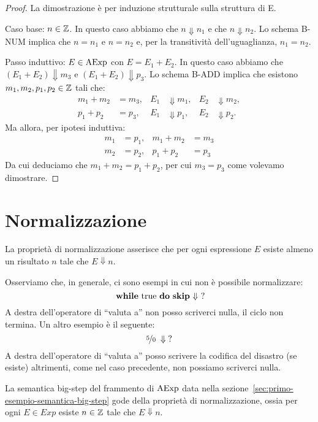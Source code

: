 \begin{proof}
La dimostrazione è per induzione strutturale sulla struttura di E.

Caso base: $n \in \mathbb{Z}$.
In questo caso abbiamo che $n \Downarrow n_1$ e che $n \Downarrow n_2$.
Lo schema B-NUM implica che $n = n_1$ e $n = n_2$ e,
per la transitività dell'uguaglianza, $n_1 = n_2$.

Passo induttivo: $E \in \mathrm{AExp}$ con $E = E_1 + E_2$.
In questo caso abbiamo che $(E_1 + E_2) \Downarrow m_3$
e $(E_1 + E_2) \Downarrow p_3$.
Lo schema B-ADD implica che esistono
$m_1, m_2, p_1, p_2 \in \mathbb{Z}$ tali che:
\begin{align*}
  m_1 + m_2 &= m_3, & E_1 &\Downarrow m_1, & E_2 &\Downarrow m_2, \\
  p_1 + p_2 &= p_3, & E_1 &\Downarrow p_1, & E_2 &\Downarrow p_2.
\end{align*}
Ma allora, per ipotesi induttiva:
\begin{align*}
m_1 &= p_1, & m_1+m_2 &= m_3 \\
m_2 &= p_2, & p_1 + p_2 &= p_3
\end{align*}
Da cui deduciamo che $ m_1 + m_2 = p_1 + p_2$, per cui
$m_3 = p_3$ come volevamo dimostrare.
\end{proof}

\section{Normalizzazione}
La proprietà di normalizzazione asserisce che per ogni espressione $E$ esiste almeno un risultato
$n$ tale che $E \Downarrow n$.

Osserviamo che, in generale, ci sono esempi in cui non è possibile normalizzare:
\[ \textrm{ $\mathop{\textup{\textbf{while}}}$ true $\mathop{\textup{\textbf{do}}}$ $\mathop{\textup{\textbf{skip}}}$ $\Downarrow$ ?} \]
A destra dell'operatore di ``valuta a'' non posso scriverci nulla, il ciclo non termina.
Un altro esempio è il seguente:
$$ \nicefrac{5}{0} \; \Downarrow \; ? $$
A destra dell'operatore di ``valuta a'' posso scrivere la codifica del disastro (se esiste)
altrimenti, come nel caso precedente, non possiamo scriverci nulla.

\begin{teorema}[Normalizzazione]
La semantica big-step del frammento di $\mathrm{AExp}$ data nella
sezione~\textup{\ref{sec:primo-esempio-semantica-big-step}}
gode della proprietà di normalizzazione, ossia per ogni
$E \in Exp$ esiste  $n \in \mathbb{Z}$ tale che $E \Downarrow n$.
\end{teorema}


